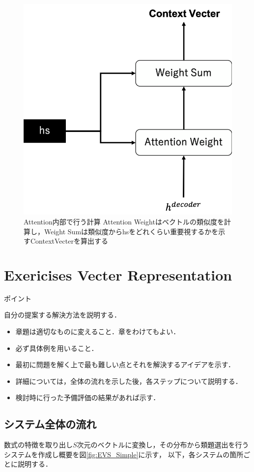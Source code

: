 \documentclass[a4j,11pt,report]{jsbook}
\newcommand{\point}[1]{
\begin{itembox}[l]{ポイント}
  #1
\end{itembox}
}
\begin{document}
\begin{center}
  \begin{figure}[ht]
    \centering
    \includegraphics[width=0.5\linewidth]{image/attention_layer.png}
    \caption{Attention内部で行う計算  Attention Weightはベクトルの類似度を計算し，Weight Sumは類似度からhsをどれくらい重要視するかを示すContextVecterを算出する}
    \label{fig:Attention_layer}
  \end{figure}
\end{center}
\fi


\chapter{Exericises Vecter Representation\label{ch:method}}
\point{
自分の提案する解決方法を説明する．
\begin{itemize}
  \item 章題は適切なものに変えること．章をわけてもよい．
  \item 必ず具体例を用いること．
  \item 最初に問題を解く上で最も難しい点とそれを解決するアイデアを示す．
  \item 詳細については，全体の流れを示した後，各ステップについて説明する．
  \item 検討時に行った予備評価の結果があれば示す．
\end{itemize}
}
\fi

\section{システム全体の流れ}

数式の特徴を取り出し$S$次元のベクトルに変換し，その分布から類題選出を行うシステムを作成し概要を図\ref{fig:EVS_Simple}に示す，
以下，各システムの箇所ごとに説明する．
\end{document}

